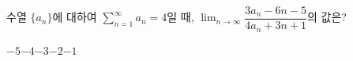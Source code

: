 수열 $\{a_n\}$에 대하여 $\displaystyle\sum_{n=1}^{\infty} a_n=4$일 때, $\displaystyle\lim_{n\to\infty}\dfrac{3a_n-6n-5}{4a_n+3n+1}$의 값은?
\begin{choices32}{$-5$}{$-4$}{$-3$}{$-2$}{$-1$}\end{choices32}
